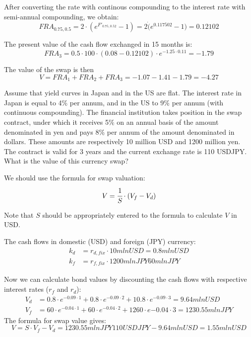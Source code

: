 \documentclass[12pt,a4paper]{exam}
\begin{document}
\begin{questions}
\begin{solution}
After converting the rate with continous compounding to the interest rate with semi-annual compounding, we obtain:
\begin{equation*}
FRA_{0.75,0.5}=2\cdot(e^{F'_{0.75,0.52}}-1)=2\dot(e^0.117502-1)=0.12102
\end{equation*}

The present value of the cash flow exchanged in 15 months is:
\begin{equation*}
FRA_3=0.5\cdot100\cdot(0.08-0.12102)\cdot e^{-1.25\cdot0.11}=-1.79
\end{equation*}

The value of the swap is then 
\begin{equation*}
V=FRA_1+FRA_2+FRA_3 = -1.07-1.41-1.79=-4.27
\end{equation*}
\end{solution}

\question Assume that yield curves in Japan and in the US are flat. The interest rate in Japan is equal to 4\% per annum, and in the US to 9\% per annum (with continuous compounding). The financial institution takes position in the swap contract, under which it receives 5\% on an annual basis of the amount denominated in yen and pays 8\% per annum of the amount denominated in dollars. These amounts are respectively 10 million USD and 1200 million yen. The contract is valid for 3 years and the current exchange rate is 110 USDJPY. What is the value of this currency swap?
\begin{solution}
We should use the formula for swap valuation: 
\begin{equation*}
V=\cfrac{1}{S}\cdot(V_f-V_d)
\end{equation*}

Note that $S$ should be appropriately entered to the formula to calculate $V$ in USD.

The cash flows in domestic (USD) and foreign (JPY) currency:
\begin{equation*}
\begin{aligned}
k_d&=r_{d, fix}\cdot 10 mln USD =0.8 mln USD \\
k_f&=r_{f, fix}\cdot 1200 mln JPY 60 mln JPY
\end{aligned}
\end{equation*}

Now we can calculate bond values by discounting the cash flows with respective interest rates ($r_f$ and $r_d$):
\begin{equation*}
\begin{aligned}
V_d&=0.8\cdot e^{-0.09\cdot1}+0.8\cdot e^{-0.09\cdot2}+10.8\cdot e^{-0.09\cdot 3}=9.64 mln USD\\
V_f&=60\cdot e^{-0.04\cdot1}+60\cdot e^{-0.04\cdot 2}+1260\cdot e{-0.04\cdot 3}=1230.55 mln JPY
\end{aligned}
\end{equation*}
The formula for swap value gives:
\begin{equation*}
V = S\cdot V_f - V_d =1230.55 mln JPY110 USDJPY-9.64 mln USD=1.55 mln USD
\end{equation*}


\end{solution}
\end{questions}
\end{document}
